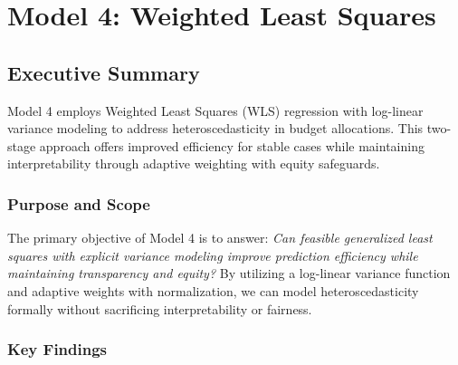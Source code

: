 \chapter{Model 4: Weighted Least Squares}\label{ch:model4}




\def\themodel{4}

\section{Executive Summary}

Model 4 employs Weighted Least Squares (WLS) regression with log-linear variance modeling to address heteroscedasticity in budget allocations. This two-stage approach offers improved efficiency for stable cases while maintaining interpretability through adaptive weighting with equity safeguards.

\subsection{Purpose and Scope}

The primary objective of Model 4 is to answer: \textit{Can feasible generalized least squares with explicit variance modeling improve prediction efficiency while maintaining transparency and equity?} By utilizing a log-linear variance function and adaptive weights with normalization, we can model heteroscedasticity formally without sacrificing interpretability or fairness.

\subsection{Key Findings}

